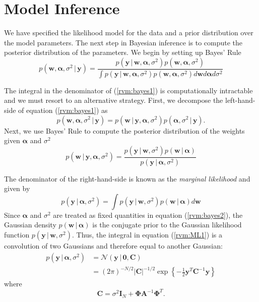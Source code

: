 \section{Model Inference}
We have specified the likelihood model for the data and a prior distribution over the model parameters.
The next step in Bayesian inference is to compute the posterior distribution of the parameters.
We begin by setting up Bayes' Rule
\begin{equation}
\label{rvm:bayes1}
  p(\bm w, \bm \alpha, \sigma^2 \,|\,\bm y) = \frac{p(\bm y \,|\, \bm w, \bm \alpha, \sigma^2) p(\bm w, \bm \alpha, \sigma^2)}
  {\int p(\bm y \,|\, \bm w, \bm \alpha, \sigma^2) p(\bm w, \bm \alpha, \sigma^2)d\bm w d\bm \alpha d\sigma^2}
\end{equation}

The integral in the denominator of (\ref{rvm:bayes1}) is computationally intractable and we must resort to an alternative strategy.
First, we decompose the left-hand-side of equation (\ref{rvm:bayes1}) as
\begin{equation*}
  p(\bm w, \bm \alpha, \sigma^2\,|\,\bm y) = p(\bm w\,|\,\bm y, \bm \alpha, \sigma^2) p(\bm\alpha,\sigma^2\,|\,\bm y).
\end{equation*}
Next, we use Bayes' Rule to compute the posterior distribution of the weights given $\bm\alpha$ and $\sigma^2$
\begin{equation}
  \label{rvm:bayes2}
  p(\bm w\,|\,\bm y, \bm \alpha, \sigma^2) = \frac{p(\bm y\,|\,\bm w,\sigma^2) p(\bm w\,|\,\bm \alpha)}{p(\bm y\,|\,\bm\alpha,\sigma^2)}
\end{equation}

The denominator of the right-hand-side is known as the \emph{marginal likelihood} and given by
\begin{equation}
  \label{rvm:ML1}
  p(\bm y\,|\,\bm\alpha,\sigma^2) = \int p(\bm y\,|\,\bm w,\sigma^2) p(\bm w\,|\,\bm \alpha) d\bm w
\end{equation}
Since $\bm\alpha$ and $\sigma^2$ are treated as fixed quantities in equation (\ref{rvm:bayes2}), the Gaussian density $p(\bm w\,|\,\bm\alpha)$ is the conjugate prior to the Gaussian likelihood function $p(\bm y\,|\,\bm w,\sigma^2)$.
Thus, the integral in equation (\ref{rvm:ML1}) is a convolution of two Gaussians and therefore equal to another Gaussian:
\begin{equation*}
  \begin{split}
    p(\bm y\,|\,\bm\alpha,\sigma^2) &= \mathcal{N}(\bm y\,|\,\bm 0,\bm C)\\
    &= (2\pi)^{-N/2} |\bm C|^{-1/2} \exp\left\{-\frac{1}{2}\bm y^T \bm C^{-1} \bm y\right\}
  \end{split}
\end{equation*}
where
\begin{equation}
  \label{rvm:C}
  \bm C = \sigma^2 \bm I_N + \bm\Phi\bm A^{-1}\bm\Phi^T.
\end{equation}


